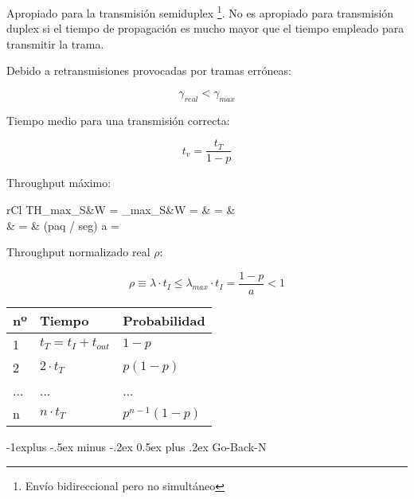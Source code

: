 \documentclass[10pt,landscape]{article}
\makeatletter
\renewcommand{\subsection}{\@startsection{subsection}{2}{0mm}%
                                {-1explus -.5ex minus -.2ex}%
                                {0.5ex plus .2ex}%
                                {\normalfont\normalsize\bfseries}}
\makeatother
\begin{document}
\begin{multicols}{3}
Apropiado para la transmisión semiduplex \footnote{Envío bidireccional pero no simultáneo}. No es apropiado para transmisión duplex si el tiempo de propagación es mucho mayor que el tiempo empleado para transmitir la trama.

Debido a retransmisiones provocadas por tramas erróneas:

	\begin{equation*}
	\gamma_{real} < \gamma_{max}
	\end{equation*}
	
Tiempo medio para una transmisión correcta:

	\begin{equation*}
	t_{v} = \frac{t_{T}}{1- p}
	\end{equation*}
	
Throughput máximo:
	
	\begin{IEEEeqnarray*}{rCl}
		TH_{max_{S\&W}}  = \lambda_{max_{S\&W}} =  & = & 	\\
								   & = &  (paq / seg) \hspace{15 pt} a =  
	\end{IEEEeqnarray*}
	
Throughput normalizado real $\rho$:

	\begin{equation*}
	\rho \equiv \lambda \cdot t_{I} \leq \lambda_{max} \cdot t_{I} = \frac{1 - p}{a} < 1
	\end{equation*}
	
\begin{center}
\begin{tabular}{|l|l|l|}

\hline
nº & Tiempo & Probabilidad \\ \hline
1  &    $t_{T} = t_{I} + t_{out}$    &        $1 - p$      \\ \hline
2  & $2 \cdot t_{T} $        &   $p(1 - p)$          \\ \hline
...   &    ...    &     ...        \\ \hline
n  &    $n \cdot t_{T}$    &      $p^{n-1} (1-p) $       \\ \hline
\end{tabular}
\end{center}

\subsection{Go-Back-N}


\end{multicols}
\end{document}
